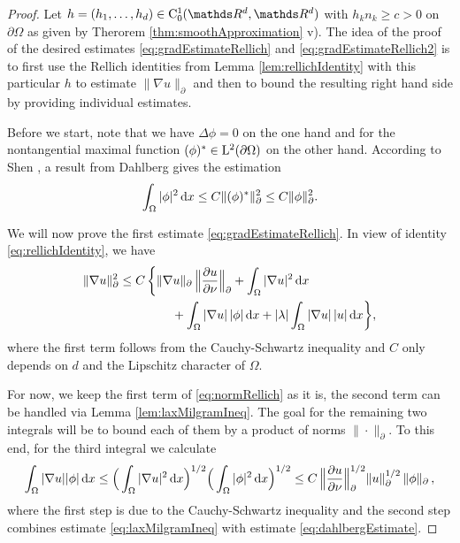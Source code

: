 \begin{proof}
  Let $h = (h_1, \dots, h_d) \in \CC_0^1(\R^d, \R^d)$ with $h_k n_k \geq c > 0$ on $\partial \Omega$ as given by Therorem \ref{thm:smoothApproximation} v). 
  The idea of the proof of the desired estimates \eqref{eq:gradEstimateRellich} and \eqref{eq:gradEstimateRellich2} is to first use the Rellich identities from Lemma \ref{lem:rellichIdentity} with this particular $h$ to estimate $\|\nabla u\|_\partial$ and then to bound the resulting right hand side by providing individual estimates.

  Before we start, note that we have $\Delta \phi = 0$ on the one hand and for the nontangential maximal function $(\phi)^* \in \mathrm{L}^2(\partial\Omega)$ on the other hand. According to Shen \cite[p. 410]{Shen2012}, a result from Dahlberg \cite{dahlberg77} gives the estimation
  \begin{align}
    \label{eq:dahlbergEstimate}
    \int_\Omega |\phi|^2 \, {\operatorname{d}\!{x}} \leq C \|(\phi)^* \|_\partial^2 \leq C \|\phi\|_\partial^2.
  \end{align}

  We will now prove the first estimate \eqref{eq:gradEstimateRellich}.
  In view of identity \eqref{eq:rellichIdentity}, we have
  \begin{align}
    \label{eq:normRellich}
    \begin{alignedat}{1}
    \|\nabla u\|_\partial^2
    &\leq C \, \bigg\{ \|\nabla u\|_\partial \, \Big\| \frac{\partial u}{\partial \nu} \Big\|_\partial + \int_\Omega |\nabla u|^2 \, {\operatorname{d}\!{x}} \\
    &\hspace{1.5cm}+ \int_\Omega |\nabla u| \, |\phi| \, {\operatorname{d}\!{x}} + |\lambda| \int_\Omega |\nabla u|\, |u| \, {\operatorname{d}\!{x}} \bigg\},
    \end{alignedat}
  \end{align}
  where the first term follows from the Cauchy-Schwartz inequality and $C$ only depends on $d$ and the Lipschitz character of $\Omega$.

  For now, we keep the first term of \eqref{eq:normRellich} as it is, the second term can be handled via Lemma \ref{lem:laxMilgramIneq}. 
  The goal for the remaining two integrals will be to bound each of them by a product of norms $\|\cdot\|_\partial$.
To this end, for the third integral we calculate
  \begin{align}
    \int_\Omega |\nabla u| |\phi| \, {\operatorname{d}\!{x}}
    \leq \Big( \int_\Omega |\nabla u|^2 \, {\operatorname{d}\!{x}} \Big)^{1/2} \Big( \int_\Omega |\phi|^2 \, {\operatorname{d}\!{x}} \Big)^{1/2}
    \leq C \, \Big\| \frac{\partial u}{\partial \nu} \Big\|_\partial^{1/2} \|u\|_\partial^{1/2} \, \|\phi\|_\partial\,, \label{eq:nablaPhi}
  \end{align}
  where the first step is due to the Cauchy-Schwartz inequality and the second step combines estimate \eqref{eq:laxMilgramIneq} with estimate \eqref{eq:dahlbergEstimate}.


\end{proof}
